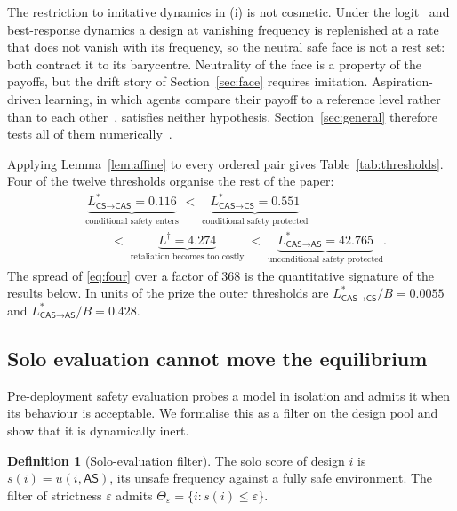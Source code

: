 \documentclass[11pt,a4paper]{article}
\theoremstyle{definition}
\newtheorem{definition}[theorem]{Definition}
\newcommand{\AS}{\textsf{AS}}
\newcommand{\CS}{\textsf{CS}}
\newcommand{\CAS}{\textsf{CAS}}
\begin{document}
The restriction to imitative dynamics in (i) is not cosmetic. Under the
logit~\citep{blume1993statistical} and best-response dynamics a design at
vanishing frequency is replenished at a
rate that does not vanish with its frequency, so the neutral safe face is not
a rest set: both contract it to its barycentre. Neutrality of the face is a
property of the payoffs, but the drift story of Section~\ref{sec:face}
requires imitation. Aspiration-driven learning, in which agents compare their
payoff to a reference level rather than to each other~\citep{posch1999aspiration}, satisfies neither hypothesis.
Section~\ref{sec:general} therefore tests all of
them numerically~\citep{sandholm2010population}.

Applying Lemma~\ref{lem:affine} to every ordered pair gives
Table~\ref{tab:thresholds}. Four of the twelve thresholds organise the rest of
the paper:
\begin{equation}
\begin{aligned}
&\underbrace{L^{*}_{\CS\to\CAS}=0.116}_{\text{conditional safety enters}}
\;<\;\underbrace{L^{*}_{\CAS\to\CS}=0.551}_{\text{conditional safety protected}}\\[2pt]
&\qquad<\;\underbrace{L^{\dagger}=4.274}_{\text{retaliation becomes too costly}}
\;<\;\underbrace{L^{*}_{\CAS\to\AS}=42.765}_{\text{unconditional safety protected}} .
\end{aligned}
\label{eq:four}
\end{equation}
The spread of \eqref{eq:four} over a factor of $368$ is the quantitative
signature of the results below. In units of the prize the outer thresholds are
$L^{*}_{\CAS\to\CS}/B=0.0055$ and $L^{*}_{\CAS\to\AS}/B=0.428$.

\subsection{Solo evaluation cannot move the equilibrium}\label{sec:filter}

Pre-deployment safety evaluation probes a model in isolation and admits it
when its behaviour is acceptable. We formalise this as a filter on the design
pool and show that it is dynamically inert.

\begin{definition}[Solo-evaluation filter]
The solo score of design $i$ is $s(i)=u(i,\AS)$, its unsafe frequency against
a fully safe environment. The filter of strictness $\varepsilon$ admits
$\Theta_{\varepsilon}=\{i: s(i)\le\varepsilon\}$.
\end{definition}
\end{document}
